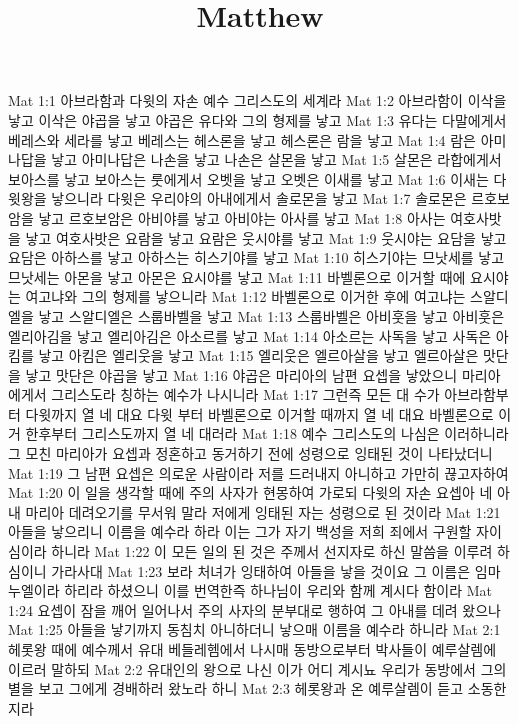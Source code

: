 

\title{Matthew}

Mat 1:1  아브라함과 다윗의 자손 예수 그리스도의 세계라
Mat 1:2  아브라함이 이삭을 낳고 이삭은 야곱을 낳고 야곱은 유다와 그의 형제를 낳고
Mat 1:3  유다는 다말에게서 베레스와 세라를 낳고 베레스는 헤스론을 낳고 헤스론은 람을 낳고
Mat 1:4  람은 아미나답을 낳고 아미나답은 나손을 낳고 나손은 살몬을 낳고
Mat 1:5  살몬은 라합에게서 보아스를 낳고 보아스는 룻에게서 오벳을 낳고 오벳은 이새를 낳고
Mat 1:6  이새는 다윗왕을 낳으니라 다윗은 우리야의 아내에게서 솔로몬을 낳고
Mat 1:7  솔로몬은 르호보암을 낳고 르호보암은 아비야를 낳고 아비야는 아사를 낳고
Mat 1:8  아사는 여호사밧을 낳고 여호사밧은 요람을 낳고 요람은 웃시야를 낳고
Mat 1:9  웃시야는 요담을 낳고 요담은 아하스를 낳고 아하스는 히스기야를 낳고
Mat 1:10  히스기야는 므낫세를 낳고 므낫세는 아몬을 낳고 아몬은 요시야를 낳고
Mat 1:11  바벨론으로 이거할 때에 요시야는 여고냐와 그의 형제를 낳으니라
Mat 1:12  바벨론으로 이거한 후에 여고냐는 스알디엘을 낳고 스알디엘은 스룹바벨을 낳고
Mat 1:13  스룹바벨은 아비훗을 낳고 아비훗은 엘리아김을 낳고 엘리아김은 아소르를 낳고
Mat 1:14  아소르는 사독을 낳고 사독은 아킴를 낳고 아킴은 엘리웃을 낳고
Mat 1:15  엘리웃은 엘르아살을 낳고 엘르아살은 맛단을 낳고 맛단은 야곱을 낳고
Mat 1:16  야곱은 마리아의 남편 요셉을 낳았으니 마리아에게서 그리스도라 칭하는 예수가 나시니라
Mat 1:17  그런즉 모든 대 수가 아브라함부터 다윗까지 열 네 대요 다윗 부터 바벨론으로 이거할 때까지 열 네 대요 바벨론으로 이거 한후부터 그리스도까지 열 네 대러라
Mat 1:18  예수 그리스도의 나심은 이러하니라 그 모친 마리아가 요셉과 정혼하고 동거하기 전에 성령으로 잉태된 것이 나타났더니
Mat 1:19  그 남편 요셉은 의로운 사람이라 저를 드러내지 아니하고 가만히 끊고자하여
Mat 1:20  이 일을 생각할 때에 주의 사자가 현몽하여 가로되 다윗의 자손 요셉아 네 아내 마리아 데려오기를 무서워 말라 저에게 잉태된 자는 성령으로 된 것이라
Mat 1:21  아들을 낳으리니 이름을 예수라 하라 이는 그가 자기 백성을 저희 죄에서 구원할 자이심이라 하니라
Mat 1:22  이 모든 일의 된 것은 주께서 선지자로 하신 말씀을 이루려 하심이니 가라사대
Mat 1:23  보라 처녀가 잉태하여 아들을 낳을 것이요 그 이름은 임마누엘이라 하리라 하셨으니 이를 번역한즉 하나님이 우리와 함께 계시다 함이라
Mat 1:24  요셉이 잠을 깨어 일어나서 주의 사자의 분부대로 행하여 그 아내를 데려 왔으나
Mat 1:25  아들을 낳기까지 동침치 아니하더니 낳으매 이름을 예수라 하니라
Mat 2:1  헤롯왕 때에 예수께서 유대 베들레헴에서 나시매 동방으로부터 박사들이 예루살렘에 이르러 말하되
Mat 2:2  유대인의 왕으로 나신 이가 어디 계시뇨 우리가 동방에서 그의 별을 보고 그에게 경배하러 왔노라 하니
Mat 2:3  헤롯왕과 온 예루살렘이 듣고 소동한지라
